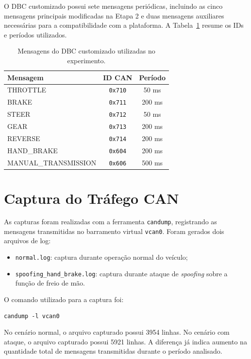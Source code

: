 \documentclass[12pt,a4paper]{article}
\begin{document}
O DBC customizado possui sete mensagens peri\'odicas, incluindo as cinco mensagens
principais modificadas na Etapa 2 e duas mensagens auxiliares necess\'arias para a
compatibilidade com a plataforma. A Tabela~\ref{tab:dbc} resume os IDs e per\'iodos
utilizados.

\begin{table}[H]
\centering
\caption{Mensagens do DBC customizado utilizadas no experimento.}
\label{tab:dbc}
\begin{tabular}{lcc}
\toprule
\textbf{Mensagem} & \textbf{ID CAN} & \textbf{Per\'iodo} \\
\midrule
THROTTLE & \texttt{0x710} & 50 ms \\
BRAKE & \texttt{0x711} & 200 ms \\
STEER & \texttt{0x712} & 50 ms \\
GEAR & \texttt{0x713} & 200 ms \\
REVERSE & \texttt{0x714} & 200 ms \\
HAND\_BRAKE & \texttt{0x604} & 200 ms \\
MANUAL\_TRANSMISSION & \texttt{0x606} & 500 ms \\
\bottomrule
\end{tabular}
\end{table}

\section{Captura do Tr\'afego CAN}

As capturas foram realizadas com a ferramenta \texttt{candump}, registrando as mensagens
transmitidas no barramento virtual \texttt{vcan0}. Foram gerados dois arquivos de log:

\begin{itemize}
    \item \texttt{normal.log}: captura durante opera\c{c}\~ao normal do ve\'iculo;
    \item \texttt{spoofing\_hand\_brake.log}: captura durante ataque de \textit{spoofing}
    sobre a fun\c{c}\~ao de freio de m\~ao.
\end{itemize}

O comando utilizado para a captura foi:

\begin{verbatim}
candump -l vcan0
\end{verbatim}

No cen\'ario normal, o arquivo capturado possui 3954 linhas. No cen\'ario com ataque,
o arquivo capturado possui 5921 linhas. A diferen\c{c}a j\'a indica aumento na quantidade
total de mensagens transmitidas durante o per\'iodo analisado.
\end{document}
